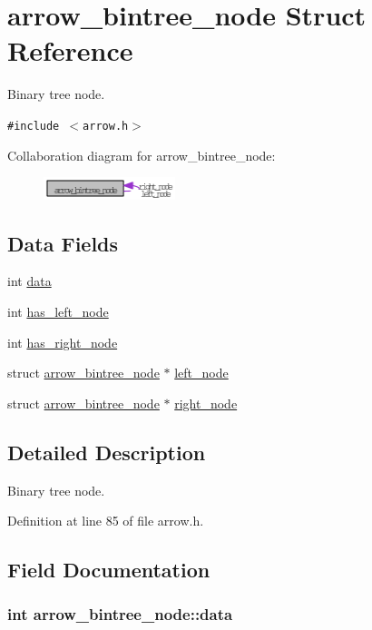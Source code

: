 \hypertarget{structarrow__bintree__node}{
\section{arrow\_\-bintree\_\-node Struct Reference}
\label{structarrow__bintree__node}
}
Binary tree node.  


{\tt \#include $<$arrow.h$>$}

Collaboration diagram for arrow\_\-bintree\_\-node:\nopagebreak
\begin{figure}[H]
\begin{center}
\leavevmode
\includegraphics[width=109pt]{structarrow__bintree__node__coll__graph}
\end{center}
\end{figure}
\subsection*{Data Fields}
\begin{CompactItemize}
\item 
int \hyperlink{structarrow__bintree__node_de01c6e7aa823db027836d77e7ce48b6}{data}
\item 
int \hyperlink{structarrow__bintree__node_a359d3d029023fb8763af3329207ee53}{has\_\-left\_\-node}
\item 
int \hyperlink{structarrow__bintree__node_f6f8bb35c520a88841a810777e9bc186}{has\_\-right\_\-node}
\item 
struct \hyperlink{structarrow__bintree__node}{arrow\_\-bintree\_\-node} $\ast$ \hyperlink{structarrow__bintree__node_e7eb125cad02704a57796b16c49b2983}{left\_\-node}
\item 
struct \hyperlink{structarrow__bintree__node}{arrow\_\-bintree\_\-node} $\ast$ \hyperlink{structarrow__bintree__node_4875801983f2b0220212951e6c0130af}{right\_\-node}
\end{CompactItemize}


\subsection{Detailed Description}
Binary tree node. 

Definition at line 85 of file arrow.h.

\subsection{Field Documentation}
\hypertarget{structarrow__bintree__node_de01c6e7aa823db027836d77e7ce48b6}{
\subsubsection{\setlength{\rightskip}{0pt plus 5cm}int {\bf arrow\_\-bintree\_\-node::data}}}
\label{structarrow__bintree__node_de01c6e7aa823db027836d77e7ce48b6}


